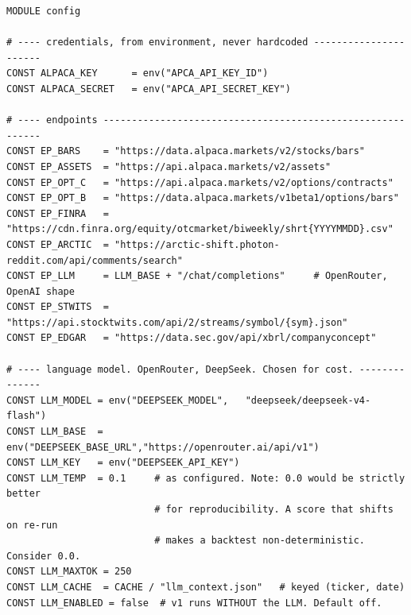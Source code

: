 \documentclass[10pt]{article}
\begin{document}
\begin{lstlisting}
MODULE config

# ---- credentials, from environment, never hardcoded ----------------------
CONST ALPACA_KEY      = env("APCA_API_KEY_ID")
CONST ALPACA_SECRET   = env("APCA_API_SECRET_KEY")

# ---- endpoints -----------------------------------------------------------
CONST EP_BARS    = "https://data.alpaca.markets/v2/stocks/bars"
CONST EP_ASSETS  = "https://api.alpaca.markets/v2/assets"
CONST EP_OPT_C   = "https://api.alpaca.markets/v2/options/contracts"
CONST EP_OPT_B   = "https://data.alpaca.markets/v1beta1/options/bars"
CONST EP_FINRA   = "https://cdn.finra.org/equity/otcmarket/biweekly/shrt{YYYYMMDD}.csv"
CONST EP_ARCTIC  = "https://arctic-shift.photon-reddit.com/api/comments/search"
CONST EP_LLM     = LLM_BASE + "/chat/completions"     # OpenRouter, OpenAI shape
CONST EP_STWITS  = "https://api.stocktwits.com/api/2/streams/symbol/{sym}.json"
CONST EP_EDGAR   = "https://data.sec.gov/api/xbrl/companyconcept"

# ---- language model. OpenRouter, DeepSeek. Chosen for cost. --------------
CONST LLM_MODEL = env("DEEPSEEK_MODEL",   "deepseek/deepseek-v4-flash")
CONST LLM_BASE  = env("DEEPSEEK_BASE_URL","https://openrouter.ai/api/v1")
CONST LLM_KEY   = env("DEEPSEEK_API_KEY")
CONST LLM_TEMP  = 0.1     # as configured. Note: 0.0 would be strictly better
                          # for reproducibility. A score that shifts on re-run
                          # makes a backtest non-deterministic. Consider 0.0.
CONST LLM_MAXTOK = 250
CONST LLM_CACHE  = CACHE / "llm_context.json"   # keyed (ticker, date)
CONST LLM_ENABLED = false  # v1 runs WITHOUT the LLM. Default off.


\end{lstlisting}
\end{document}
